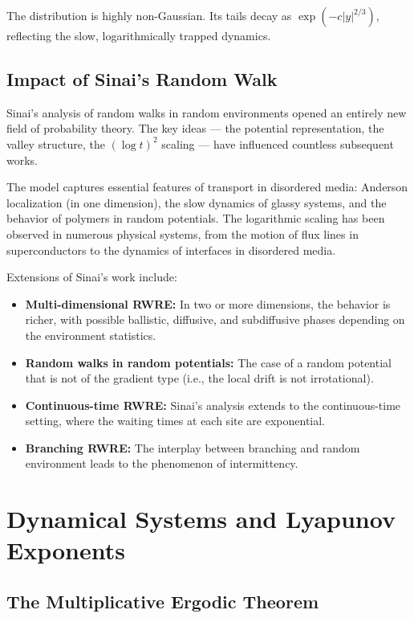 The distribution is highly non-Gaussian. Its tails decay as \(\exp(-c|y|^{2/3})\), reflecting the slow, logarithmically trapped dynamics.

\subsection{Impact of Sinai's Random Walk}

Sinai's analysis of random walks in random environments opened an entirely new field of probability theory. The key ideas --- the potential representation, the valley structure, the \((\log t)^2\) scaling --- have influenced countless subsequent works.

The model captures essential features of transport in disordered media: Anderson localization (in one dimension), the slow dynamics of glassy systems, and the behavior of polymers in random potentials. The logarithmic scaling has been observed in numerous physical systems, from the motion of flux lines in superconductors to the dynamics of interfaces in disordered media.

Extensions of Sinai's work include:
\begin{itemize}
  \item \textbf{Multi-dimensional RWRE:} In two or more dimensions, the behavior is richer, with possible ballistic, diffusive, and subdiffusive phases depending on the environment statistics.
  \item \textbf{Random walks in random potentials:} The case of a random potential that is not of the gradient type (i.e., the local drift is not irrotational).
  \item \textbf{Continuous-time RWRE:} Sinai's analysis extends to the continuous-time setting, where the waiting times at each site are exponential.
  \item \textbf{Branching RWRE:} The interplay between branching and random environment leads to the phenomenon of intermittency.
\end{itemize}

\section{Dynamical Systems and Lyapunov Exponents}

\subsection{The Multiplicative Ergodic Theorem}

